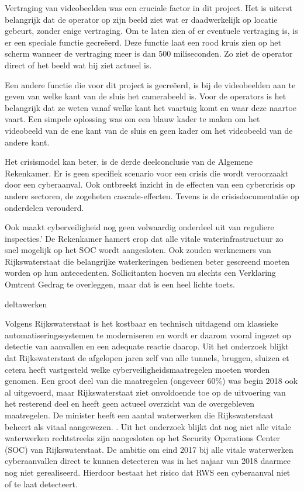 Vertraging van videobeelden was een cruciale factor in dit project. Het is uiterst belangrijk dat de operator op zijn beeld ziet wat er daadwerkelijk op locatie gebeurt, zonder enige vertraging. Om te laten zien of er eventuele vertraging is, is er een speciale functie gecreëerd. Deze functie laat een rood kruis zien op het scherm wanneer de vertraging meer is dan 500 miliseconden. Zo ziet de operator direct of het beeld wat hij ziet actueel is. 

Een andere functie die voor dit project is gecreëerd, is bij de videobeelden aan te geven van welke kant van de sluis het camerabeeld is. Voor de operators is het belangrijk dat ze weten vanaf welke kant het vaartuig komt en waar deze naartoe vaart. Een simpele oplossing was om een blauw kader te maken om het videobeeld van de ene kant van de sluis en geen kader om het videobeeld van de andere kant. 


\cite{thkwaterwerken}
Het crisismodel kan beter, is de derde deelconclusie van de Algemene Rekenkamer. Er is geen specifiek scenario voor een crisis die wordt veroorzaakt door een cyberaanval. Ook ontbreekt inzicht in de effecten van een cybercrisis op andere sectoren, de zogeheten cascade-effecten. Tevens is de crisisdocumentatie op onderdelen verouderd.

\cite{rekenkamercybersecWater}
Ook maakt cyberveiligheid nog geen volwaardig onderdeel uit van reguliere inspecties.’ De Rekenkamer hamert erop dat alle vitale waterinfrastructuur zo snel mogelijk op het SOC wordt aangesloten. Ook zouden werknemers van Rijkswaterstaat die belangrijke waterkeringen bedienen beter gescreend moeten worden op hun antecedenten. Sollicitanten hoeven nu slechts een Verklaring Omtrent Gedrag te overleggen, maar dat is een heel lichte toets.

\cite{hackerWaterwerk}
deltawerken

\cite{kramerZeeland}
Volgens Rijkswaterstaat is het kostbaar en technisch uitdagend om klassieke automatiseringssystemen te moderniseren en wordt er daarom vooral ingezet op detectie van aanvallen en een adequate reactie daarop.
Uit het onderzoek blijkt dat Rijkswaterstaat de afgelopen jaren zelf van alle tunnels, bruggen, sluizen et cetera heeft vastgesteld welke cyberveiligheidsmaatregelen moeten worden genomen. Een groot deel van die maatregelen (ongeveer 60\%) was begin 2018 ook al uitgevoerd, maar Rijkswaterstaat ziet onvoldoende toe op de uitvoering van het resterend deel en heeft geen actueel overzicht van de overgebleven maatregelen.
De minister heeft een aantal waterwerken die Rijkswaterstaat beheert als vitaal aangewezen. . Uit het onderzoek blijkt dat nog niet alle vitale waterwerken rechtstreeks zijn aangesloten op het Security Operations Center (SOC) van Rijkswaterstaat. De ambitie om eind 2017 bij alle vitale waterwerken cyberaanvallen direct te kunnen detecteren was in het najaar van 2018 daarmee nog niet gerealiseerd. Hierdoor bestaat het risico dat RWS een cyberaanval niet of te laat detecteert.

